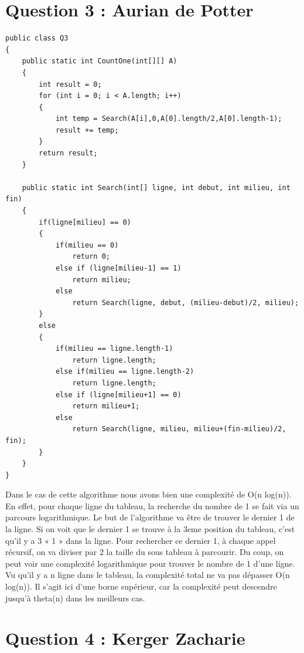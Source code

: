 \documentclass[10pt,a4paper]{article}
\begin{document}
\section*{Question 3 : Aurian de Potter}
\begin{lstlisting}
public class Q3
{
	public static int CountOne(int[][] A)
	{
		int result = 0;
		for (int i = 0; i < A.length; i++) 
		{
			int temp = Search(A[i],0,A[0].length/2,A[0].length-1);
			result += temp;
		}
		return result;
	}
	
	public static int Search(int[] ligne, int debut, int milieu, int fin)
	{
		if(ligne[milieu] == 0)
		{
			if(milieu == 0)
				return 0;
			else if (ligne[milieu-1] == 1)
				return milieu;
			else
				return Search(ligne, debut, (milieu-debut)/2, milieu);
		}
		else
		{
			if(milieu == ligne.length-1)
				return ligne.length;
			else if(milieu == ligne.length-2)
				return ligne.length;
			else if (ligne[milieu+1] == 0)
				return milieu+1;
			else
				return Search(ligne, milieu, milieu+(fin-milieu)/2, fin);
		}
	}
}
\end{lstlisting}

Dans le cas de cette algorithme nous avons bien une complexité de O(n log(n)). En effet, pour chaque ligne du tableau, la recherche du nombre de 1 se fait via un parcours logarithmique. Le but de l’algorithme va être de trouver le dernier 1 de la ligne. Si on voit que le dernier 1 se trouve à la 3eme position du tableau, c’est qu’il y a 3 « 1 » dans la ligne. Pour rechercher ce dernier 1, à chaque appel récursif, on va diviser par 2 la taille du sous tableau à parcourir. Du coup, on peut voir une complexité logarithmique pour trouver le nombre de 1 d’une ligne. Vu qu’il y a n ligne dans le tableau, la complexité total ne va pas dépasser O(n log(n)). Il s’agit ici d’une borne supérieur, car la complexité peut descendre jusqu’à theta(n) dans les meilleurs cas.

\section*{Question 4 : Kerger Zacharie}
\end{document}

